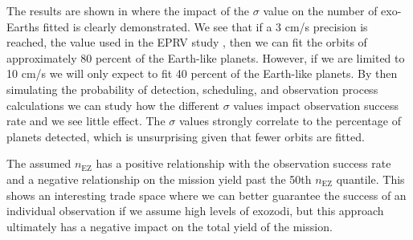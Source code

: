 The results are shown in  where the impact of
the $\sigma$ value on the number of exo-Earths fitted is clearly demonstrated.
We see that if a 3 cm/s precision is reached, the value used in the EPRV study
\citet{morganExplorationExpectedNumber2022a}, then we can fit the orbits of
approximately 80 percent of the Earth-like planets. However, if we are limited
to 10 cm/s we will only expect to fit 40 percent of the Earth-like planets. By
then simulating the probability of detection, scheduling, and observation
process calculations we can study how the different $\sigma$ values impact
observation success rate and we see little effect. The $\sigma$ values strongly
correlate to the percentage of planets detected, which is unsurprising given
that fewer orbits are fitted.

The assumed $n_\textrm{EZ}$ has a positive relationship with the observation
success rate and a negative relationship on the mission yield past the 50th
$n_\textrm{EZ}$ quantile. This shows an interesting trade space where we can
better guarantee the success of an individual observation if we assume high
levels of exozodi, but this approach ultimately has a negative impact on the
total yield of the mission.

